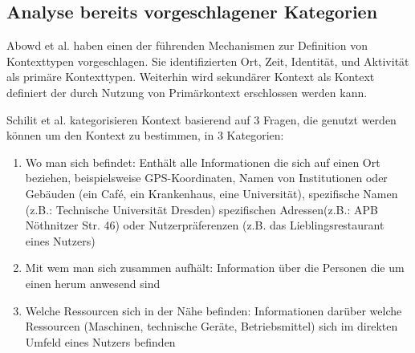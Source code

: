 \subsection{ Analyse bereits vorgeschlagener Kategorien} 
Abowd et al.\cite{abowd_towards_1999} haben einen der führenden Mechanismen zur Definition von Kontexttypen vorgeschlagen. Sie identifizierten Ort, Zeit, Identität, und Aktivität als primäre Kontexttypen. Weiterhin wird sekundärer Kontext als Kontext definiert der durch Nutzung von Primärkontext erschlossen werden kann.

Schilit et al. \cite{schilit_context-aware_1994} kategorisieren Kontext basierend auf 3 Fragen, die genutzt werden können um den Kontext zu bestimmen, in 3 Kategorien:
\begin{enumerate}
\item{Wo man sich befindet: Enthält alle Informationen die sich auf einen Ort beziehen, beispielsweise GPS-Koordinaten, Namen von Institutionen oder Gebäuden (ein Café, ein Krankenhaus, eine Universität), spezifische Namen (z.B.: Technische Universität Dresden) spezifischen Adressen(z.B.: APB Nöthnitzer Str. 46) oder Nutzerpräferenzen (z.B. das Lieblingsrestaurant eines Nutzers) }
\item{Mit wem man sich zusammen aufhält: Information über die Personen die um einen herum anwesend sind}
\item{Welche Ressourcen sich in der Nähe befinden: Informationen darüber welche Ressourcen (Maschinen, technische Geräte, Betriebsmittel) sich im direkten Umfeld eines Nutzers befinden}
\end{enumerate}

